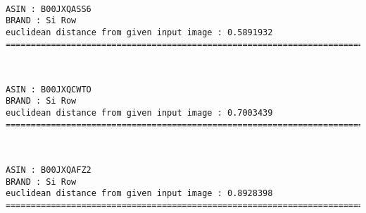 \documentclass[11pt]{article}
\begin{document}
    \begin{center}
    \end{center}
    { \hspace*{\fill} \\}
    
    \begin{Verbatim}[commandchars=\\\{\}]
ASIN : B00JXQASS6
BRAND : Si Row
euclidean distance from given input image : 0.5891932
=============================================================================================================================

    \end{Verbatim}

    \begin{center}
    \end{center}
    { \hspace*{\fill} \\}
    
    \begin{Verbatim}[commandchars=\\\{\}]
ASIN : B00JXQCWTO
BRAND : Si Row
euclidean distance from given input image : 0.7003439
=============================================================================================================================

    \end{Verbatim}

    \begin{center}
    \end{center}
    { \hspace*{\fill} \\}
    
    \begin{Verbatim}[commandchars=\\\{\}]
ASIN : B00JXQAFZ2
BRAND : Si Row
euclidean distance from given input image : 0.8928398
=============================================================================================================================

    \end{Verbatim}

    \begin{center}
    \end{center}
    { \hspace*{\fill} \\}
    
\end{document}
